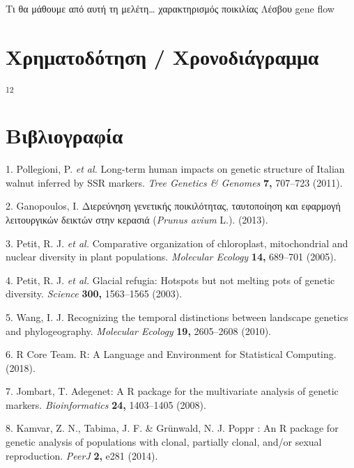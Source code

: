 \documentclass[12pt,a4paper,]{report}
\begin{document}
Τι θα μάθουμε από αυτή τη μελέτη\ldots{} χαρακτηρισμός ποικιλίας Λέσβου
gene flow

\hypertarget{-}{%
\section{Χρηματοδότηση / Χρονοδιάγραμμα}\label{-}}

\textsuperscript{12}

\section{Βιβλιογραφία}

\hypertarget{refs}{}
\leavevmode\hypertarget{ref-pollegioni_long-term_2011}{}%
1. Pollegioni, P. \emph{et al.} Long-term human impacts on genetic
structure of Italian walnut inferred by SSR markers. \emph{Tree Genetics
\& Genomes} \textbf{7,} 707--723 (2011).

\leavevmode\hypertarget{ref-ganopoulos__2013}{}%
2. Ganopoulos, I. Διερεύνηση γενετικής ποικιλότητας, ταυτοποίηση και
εφαρμογή λειτουργικών δεικτών στην κερασιά (\emph{Prunus avium} L.).
(2013).

\leavevmode\hypertarget{ref-petit_comparative_2005}{}%
3. Petit, R. J. \emph{et al.} Comparative organization of chloroplast,
mitochondrial and nuclear diversity in plant populations.
\emph{Molecular Ecology} \textbf{14,} 689--701 (2005).

\leavevmode\hypertarget{ref-petit_glacial_2003}{}%
4. Petit, R. J. \emph{et al.} Glacial refugia: Hotspots but not melting
pots of genetic diversity. \emph{Science} \textbf{300,} 1563--1565
(2003).

\leavevmode\hypertarget{ref-wang_recognizing_2010}{}%
5. Wang, I. J. Recognizing the temporal distinctions between landscape
genetics and phylogeography. \emph{Molecular Ecology} \textbf{19,}
2605--2608 (2010).

\leavevmode\hypertarget{ref-r_core_team_r:_2018}{}%
6. R Core Team. R: A Language and Environment for Statistical Computing.
(2018).

\leavevmode\hypertarget{ref-jombart_adegenet:_2008}{}%
7. Jombart, T. Adegenet: A R package for the multivariate analysis of
genetic markers. \emph{Bioinformatics} \textbf{24,} 1403--1405 (2008).

\leavevmode\hypertarget{ref-kamvar_poppr_2014}{}%
8. Kamvar, Z. N., Tabima, J. F. \& Grünwald, N. J. Poppr : An R package
for genetic analysis of populations with clonal, partially clonal,
and/or sexual reproduction. \emph{PeerJ} \textbf{2,} e281 (2014).
\end{document}
